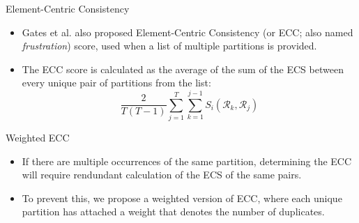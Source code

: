 \begin{frame}{Element-Centric Consistency}
    \begin{itemize}
        \item Gates et al. also proposed Element-Centric Consistency (or ECC; also named  \textit{frustration}) score, used when a list of multiple partitions is provided.
        \item The ECC score is calculated as the average of the sum of the ECS between every unique pair of partitions from the list:
              \begin{equation*}
                  \frac{2}{T(T-1)} \sum_{j=1}^T \sum_{k=1}^{j-1} S_i (\mathcal{R}_k, \mathcal{R}_j)
              \end{equation*}
    \end{itemize}
\end{frame}


\begin{frame}[label=wecc]{Weighted ECC}
    \begin{itemize}
        \item If there are multiple occurrences of the same partition, determining the ECC will require rendundant calculation of the ECS of the same pairs.
        \item To prevent this, we propose a weighted version of ECC, where each unique partition has attached a weight that denotes the number of duplicates.
    \end{itemize}
    \hyperlink{weight-ecc}{}
\end{frame}


